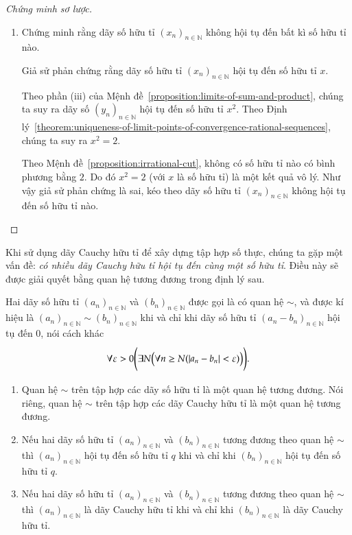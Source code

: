 \begin{proof}[Chứng minh sơ lược]
\begin{enumerate}[label={\textbf{Bước \arabic*.}},itemindent=1cm]
		      Theo định nghĩa dãy số hội tụ, dãy số hữu tỉ ${(y_{n})}_{n\in\mathbb{N}}$ hội tụ đến $2$.
		\item Chứng minh rằng dãy số hữu tỉ ${(x_{n})}_{n\in\mathbb{N}}$ không hội tụ đến bất kì số hữu tỉ nào.

		      Giả sử phản chứng rằng dãy số hữu tỉ ${(x_{n})}_{n\in\mathbb{N}}$ hội tụ    đến số hữu tỉ $x$.

		      Theo phần (iii) của Mệnh đề~\ref{proposition:limits-of-sum-and-product}, chúng ta suy ra dãy số ${(y_{n})}_{n\in\mathbb{N}}$ hội tụ đến số hữu tỉ $x^{2}$. Theo Định lý~\ref{theorem:uniqueness-of-limit-points-of-convergence-rational-sequences}, chúng ta suy ra $x^{2} = 2$.

		      Theo Mệnh đề~\ref{proposition:irrational-cut}, không có số hữu tỉ nào có bình phương bằng $2$. Do đó $x^{2} = 2$ (với $x$ là số hữu tỉ) là một kết quả vô lý. Như vậy giả sử phản chứng là sai, kéo theo dãy số hữu tỉ ${(x_{n})}_{n\in\mathbb{N}}$ không hội tụ đến số hữu tỉ nào.
	\end{enumerate}
\end{proof}

Khi sử dụng dãy Cauchy hữu tỉ để xây dựng tập hợp số thực, chúng ta gặp một vấn đề: \textit{có nhiều dãy Cauchy hữu tỉ hội tụ đến cùng một số hữu tỉ}. Điều này sẽ được giải quyết bằng quan hệ tương đương trong định lý sau.

\begin{theorem}
	Hai dãy số hữu tỉ ${(a_{n})}_{n\in\mathbb{N}}$ và ${(b_{n})}_{n\in\mathbb{N}}$ được gọi là có quan hệ $\sim$, và được kí hiệu là ${(a_{n})}_{n\in\mathbb{N}} \sim {(b_{n})}_{n\in\mathbb{N}}$ khi và chỉ khi dãy số hữu tỉ ${(a_{n} - b_{n})}_{n\in\mathbb{N}}$ hội tụ đến $0$, nói cách khác
	\[
		\forall\varepsilon > 0\Biggl( \exists N \Bigl( \forall n\geq N ( \left\vert{a_{n} - b_{n}}\right\vert < \varepsilon ) \Bigr) \Biggr).
	\]
	\begin{enumerate}[label={(\roman*)},itemsep=0pt]
		\item Quan hệ $\sim$ trên tập hợp các dãy số hữu tỉ là một quan hệ tương đương. Nói riêng, quan hệ $\sim$ trên tập hợp các dãy Cauchy hữu tỉ là một quan hệ tương đương.
		\item Nếu hai dãy số hữu tỉ ${(a_{n})}_{n\in\mathbb{N}}$ và ${(b_{n})}_{n\in\mathbb{N}}$ tương đương theo quan hệ $\sim$ thì ${(a_{n})}_{n\in\mathbb{N}}$ hội tụ đến số hữu tỉ $q$ khi và chỉ khi ${(b_{n})}_{n\in\mathbb{N}}$ hội tụ đến số hữu tỉ $q$.
		\item Nếu hai dãy số hữu tỉ ${(a_{n})}_{n\in\mathbb{N}}$ và ${(b_{n})}_{n\in\mathbb{N}}$ tương đương theo quan hệ $\sim$ thì ${(a_{n})}_{n\in\mathbb{N}}$ là dãy Cauchy hữu tỉ khi và chỉ khi ${(b_{n})}_{n\in\mathbb{N}}$ là dãy Cauchy hữu tỉ.
	\end{enumerate}
\end{theorem}

